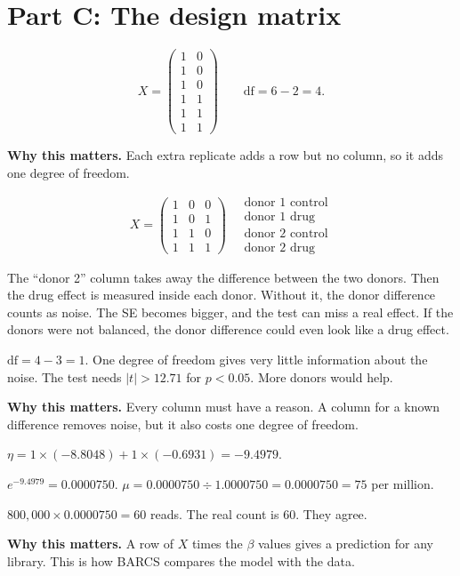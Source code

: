 \documentclass[12pt]{article}
\newcommand{\why}[1]{\par\smallskip\noindent\textcolor{barcsgreen!70!black}{\textbf{Why this matters.}} #1}
\begin{document}
\section*{Part C: The design matrix}
\begin{exlist}[resume]
\item
\[
X = \begin{pmatrix} 1 & 0\\ 1 & 0\\ 1 & 0\\ 1 & 1\\ 1 & 1\\ 1 & 1 \end{pmatrix}
\qquad \text{df} = 6 - 2 = 4.
\]
\why{Each extra replicate adds a row but no column, so it adds one degree of
freedom.}

\item
\begin{parts}
\item
\[
X = \begin{pmatrix} 1 & 0 & 0\\ 1 & 0 & 1\\ 1 & 1 & 0\\ 1 & 1 & 1 \end{pmatrix}
\quad \begin{array}{l} \text{donor 1 control}\\ \text{donor 1 drug}\\
\text{donor 2 control}\\ \text{donor 2 drug} \end{array}
\]
\item The ``donor 2'' column takes away the difference between the two
  donors. Then the drug effect is measured inside each donor. Without it,
  the donor difference counts as noise. The SE becomes bigger, and the test
  can miss a real effect. If the donors were not balanced, the donor
  difference could even look like a drug effect.
\item $\text{df} = 4 - 3 = 1$. One degree of freedom gives very little
  information about the noise. The test needs $|t| > 12.71$ for
  $p < 0.05$. More donors would help.
\end{parts}
\why{Every column must have a reason. A column for a known difference
removes noise, but it also costs one degree of freedom.}

\item
\begin{parts}
\item $\eta = 1 \times (-8.8048) + 1 \times (-0.6931) = -9.4979$.
\item $e^{-9.4979} = 0.0000750$. $\mu = 0.0000750 \div 1.0000750 =
  0.0000750 = 75$ per million.
\item $800{,}000 \times 0.0000750 = 60$ reads. The real count is 60. They
  agree.
\end{parts}
\why{A row of $X$ times the $\beta$ values gives a prediction for any
library. This is how BARCS compares the model with the data.}


\end{exlist}
\end{document}
